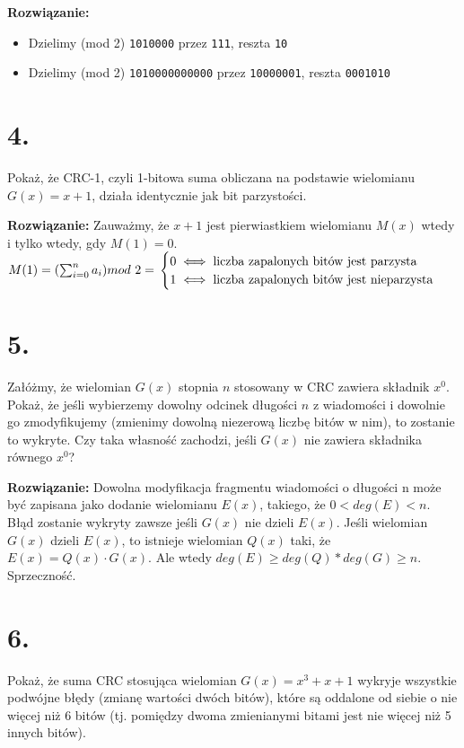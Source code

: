 \documentclass{article}
\begin{document}
\textbf{Rozwiązanie:} \begin{itemize}
    \item Dzielimy (mod 2) \texttt{1010000} przez \texttt{111}, reszta \texttt{10}
    \item Dzielimy (mod 2) \texttt{1010000000000} przez \texttt{10000001}, reszta \texttt{0001010}
\end{itemize}
\section*{4.}
Pokaż, że CRC-1, czyli 1-bitowa suma obliczana na podstawie wielomianu $G (x) = x + 1$, działa identycznie jak bit parzystości.

\textbf{Rozwiązanie:} Zauważmy, że $x+1$ jest pierwiastkiem wielomianu $M(x)$ wtedy i tylko wtedy, gdy $M(1)=0$. $M(1) = (\sum_{i=0}^{n}a_i) mod\ 2 = \newline \begin{cases}
    0 \iff \text{liczba zapalonych bitów jest parzysta}\\
    1 \iff \text{liczba zapalonych bitów jest nieparzysta}
\end{cases}
$

\section*{5.} Załóżmy, że wielomian $G(x)$ stopnia $n$ stosowany w CRC zawiera składnik $x^0$. Pokaż, że jeśli wybierzemy dowolny odcinek długości $n$ z wiadomości i dowolnie go zmodyfikujemy (zmienimy dowolną niezerową liczbę bitów w nim), to zostanie to wykryte. Czy taka własność zachodzi, jeśli $G(x)$ nie zawiera składnika równego $x^0$?

\textbf{Rozwiązanie:} Dowolna modyfikacja fragmentu wiadomości o długości n może być zapisana jako dodanie wielomianu $E(x)$, takiego, że $0<deg(E)<n$. Błąd zostanie wykryty zawsze jeśli $G(x)$ nie dzieli $E(x)$. Jeśli wielomian $G(x)$ dzieli $E(x)$, to istnieje wielomian $Q(x)$ taki, że $E(x) = Q(x) \cdot G(x)$. Ale wtedy $deg(E) \geq deg(Q)*deg(G) \geq n$. Sprzeczność.

\section*{6.} Pokaż, że suma CRC stosująca wielomian $G(x) = x^3 + x + 1$ wykryje wszystkie podwójne błędy (zmianę wartości dwóch bitów), które są oddalone od siebie o nie więcej niż 6 bitów (tj. pomiędzy dwoma zmienianymi bitami jest nie więcej niż 5 innych bitów).
\end{document}
